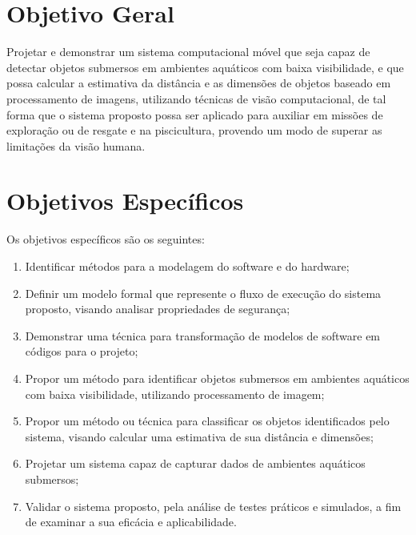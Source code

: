 

\section{Objetivo Geral}
Projetar e demonstrar um sistema computacional móvel que seja capaz de detectar objetos submersos em ambientes aquáticos com baixa visibilidade, e que possa calcular a estimativa da distância e as dimensões de objetos baseado em processamento de imagens, utilizando técnicas de visão computacional, de tal forma que o sistema proposto possa ser aplicado para auxiliar em missões de exploração ou de resgate e na piscicultura, provendo um modo de superar as limitações da visão humana.

\section{Objetivos Específicos}
Os objetivos específicos são os seguintes:
	\begin{enumerate}
		\item Identificar métodos para a modelagem do software e do hardware;

		\item Definir um modelo formal que represente o fluxo de execução do sistema proposto, visando analisar propriedades de segurança;

		\item Demonstrar uma técnica para transformação de modelos de software em códigos para o projeto;

		\item Propor um método para identificar objetos submersos em ambientes aquáticos com baixa visibilidade, utilizando processamento de imagem;

		\item Propor um método ou técnica para classificar os objetos identificados pelo sistema, visando calcular uma estimativa de sua distância e dimensões;

		\item Projetar um sistema capaz de capturar dados de ambientes aquáticos submersos;

		\item Validar o sistema proposto, pela análise de testes práticos e simulados, a fim de examinar a sua eficácia e aplicabilidade.

	\end{enumerate}
    

